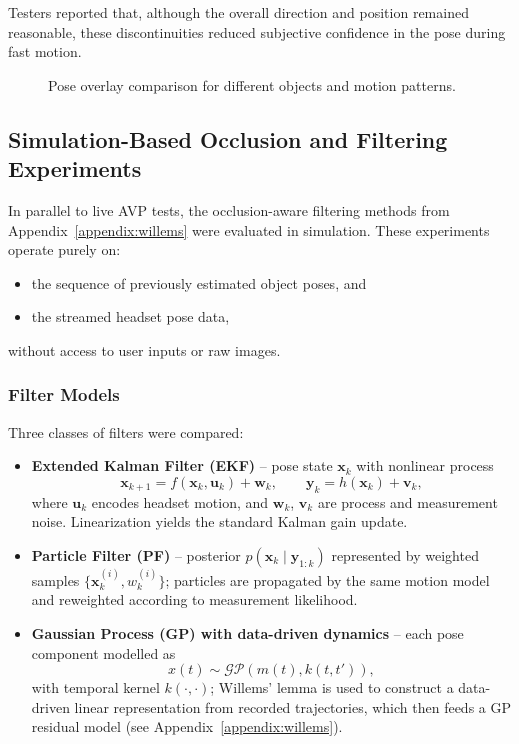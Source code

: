 Testers reported that, although the overall direction and position remained reasonable, these discontinuities reduced subjective confidence in the pose during fast motion.

\begin{figure}[H]
    \centering
    \caption[Pose overlay comparison in different motion conditions]{Pose overlay comparison for different objects and motion patterns.}
    \label{fig:poseoverlay}
\end{figure}

\subsection{Simulation-Based Occlusion and Filtering Experiments}

In parallel to live AVP tests, the occlusion-aware filtering methods from Appendix~\ref{appendix:willems} were evaluated in simulation. These experiments operate purely on:

\begin{itemize}
    \item the sequence of previously estimated object poses, and
    \item the streamed headset pose data,
\end{itemize}

without access to user inputs or raw images.

\subsubsection{Filter Models}

Three classes of filters were compared:

\begin{itemize}
    \item \textbf{Extended Kalman Filter (EKF)} – pose state $\mathbf{x}_k$ with nonlinear process
    \[
        \mathbf{x}_{k+1} = f(\mathbf{x}_k, \mathbf{u}_k) + \mathbf{w}_k,
        \qquad
        \mathbf{y}_k = h(\mathbf{x}_k) + \mathbf{v}_k,
    \]
    where $\mathbf{u}_k$ encodes headset motion, and $\mathbf{w}_k$, $\mathbf{v}_k$ are process and measurement noise. Linearization yields the standard Kalman gain update.
    \item \textbf{Particle Filter (PF)} – posterior $p(\mathbf{x}_k \mid \mathbf{y}_{1:k})$ represented by weighted samples $\{ \mathbf{x}_k^{(i)}, w_k^{(i)} \}$; particles are propagated by the same motion model and reweighted according to measurement likelihood.
    \item \textbf{Gaussian Process (GP) with data-driven dynamics} – each pose component modelled as
    \[
        x(t) \sim \mathcal{GP}(m(t), k(t,t')),
    \]
    with temporal kernel $k(\cdot,\cdot)$; Willems’ lemma is used to construct a data-driven linear representation from recorded trajectories, which then feeds a GP residual model (see Appendix~\ref{appendix:willems}).
\end{itemize}

